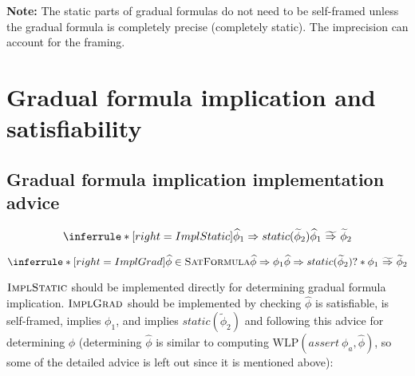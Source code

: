 \documentclass {article}
\newcommand{\fphi}{\widehat{\phi}}
\newcommand{\tphi}{\widetilde{\phi}}
\newcommand{\imp}{\Rightarrow}
\newcommand{\timp}{\ \widetilde{\Rightarrow}\ }
\newcommand{\wlp}[2]{\text{WLP}(#1,#2)}
\newcommand{\twlp}[2]{\widetilde{\text{WLP}}(#1,#2)}
\newcommand{\satdef}{\textsc{SatFormula}}
\newcommand{\implsdef}{\textsc{ImplStatic}}
\newcommand{\implgdef}{\textsc{ImplGrad}}
\begin{document}
\vspace{0.5cm}
%
%
%
%

\textbf{Note:} The static parts of gradual formulas do not need to be self-framed unless the gradual formula is completely precise (completely static). The imprecision can account for the framing.

\section{Gradual formula implication and satisfiability}

\subsection{Gradual formula implication implementation advice}

\[ \inferrule*[right=ImplStatic]
   {\fphi_1 \imp static(\tphi_2) }
   {\fphi_1 \timp \tphi_2}
\]

\[
\inferrule*[right=ImplGrad]
   {\fphi \in \satdef \\ \fphi \imp \phi_1 \\ \fphi \imp static(\tphi_2)}
   {? \ast \phi_1 \timp \tphi_2}
\]

$\implsdef$ should be implemented directly for determining gradual formula implication. $\implgdef$ should be implemented by checking $\fphi$ is satisfiable, is self-framed, implies $\phi_1$, and implies $static(\tphi_2)$ and following this advice for determining $\fphi$ (determining $\fphi$ is similar to computing $\wlp{assert\ \phi_a}{\fphi}$, so some of the detailed advice is left out since it is mentioned above):
\end{document}
